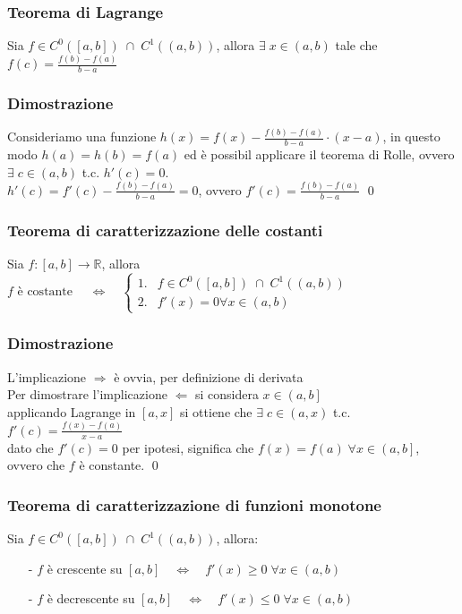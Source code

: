 \documentclass[a4paper]{article}
\newcommand\cont[2]{C^{#1} \left({#2}\right)}
\begin{document}
\subsubsection*{Teorema di Lagrange}
Sia \(f \in \cont{0}{\left[a, b\right]} \; \cap \; \cont{1}{\left(a, b\right)}\), allora \(\exists \; x \in \left(a, b\right)\) tale
che \(\displaystyle f(c) = \frac{f(b) - f(a)}{b - a}\)

\subsubsection*{Dimostrazione}
Consideriamo una funzione \(h(x) = f(x) - \frac{f(b) - f(a)}{b- a} \cdot \left(x - a\right)\), in questo modo \(h(a) = h(b) = f(a)\)
ed è possibil applicare il teorema di Rolle, ovvero \(\exists \; c \in \left(a, b\right)\) t.c. \(h'(c) = 0\). \\
\(\displaystyle h'(c) = f'(c) - \frac{f(b) - f(a)}{b - a} = 0\), ovvero \(\displaystyle f'(c) = \frac{f(b) - f(a)}{b - a}\)
\qed

\subsubsection*{Teorema di caratterizzazione delle costanti}
Sia \(f:\left[a,b\right] \to \mathbb{R}\), allora \(\displaystyle f \text{ è costante } \quad \Leftrightarrow \quad
\begin{cases}
	\text{1.} &f \in \cont{0}{\left[a, b\right]} \; \cap \; \cont{1}{\left(a, b\right)} \\
	\text{2.} &f'(x) = 0 \forall x \in \left(a, b\right)
\end{cases}\)

\subsubsection*{Dimostrazione}
L'implicazione \(\Rightarrow\) è ovvia, per definizione di derivata \\
Per dimostrare l'implicazione \(\Leftarrow\) si considera \(x \in \left(a, b\right]\) \\
applicando Lagrange in \(\left[a, x\right]\) si ottiene che \(\exists \; c \in \left(a, x\right)\) t.c. \(\displaystyle f'(c) = \frac{f(x)- f(a)}{x-a}\) \\
dato che \(f'(c) = 0\) per ipotesi, significa che \(f(x) = f(a) \; \forall x \in \left(a, b\right]\), ovvero che \(f\) è constante.
\qed

\subsubsection*{Teorema di caratterizzazione di funzioni monotone}
Sia \(f \in \cont{0}{\left[a, b\right]} \; \cap \; \cont{1}{\left(a, b\right)}\), allora:
\begin{itemize}[topsep=3pt, itemsep=0pt]
	\item[-] \(f\) è crescente su \(\left[a, b\right] \quad \Leftrightarrow \quad f'(x) \geq 0 \; \forall x \in \left(a, b\right)\) 
	\item[-] \(f\) è decrescente su \(\left[a, b\right] \quad \Leftrightarrow \quad f'(x) \leq 0 \; \forall x \in \left(a, b\right)\) 
\end{itemize}
\end{document}
